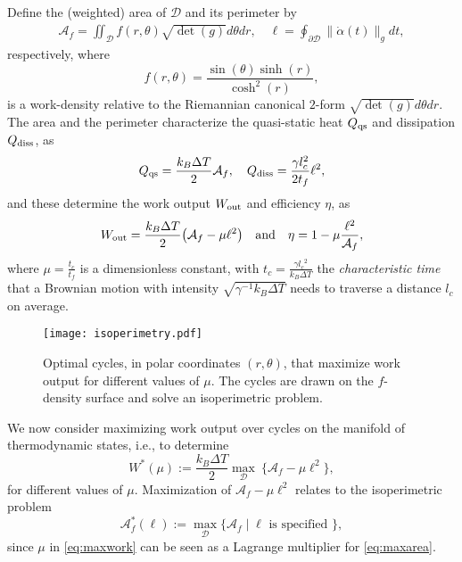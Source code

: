 \documentclass[
 reprint,
superscriptaddress,
 amsmath,amssymb,prl
 aps
]{revtex4-2}
\newcommand{\Area}{{\mathcal A}}
\newcommand{\lam}{{l_c}}
\begin{document}
Define the (weighted) area of $\mathcal D$  and its perimeter by
\begin{align*}
    \Area_f =\iint_{\mathcal D}f(r,\theta)\sqrt{\det(g)}d\theta d r,\quad 
    \ell = \oint_{\partial \mathcal D} \|\dot\alpha(t)\|_gdt,
\end{align*}
respectively, where 
\[
f(r,\theta)=\frac{\sin(\theta)\sinh(r)}{\cosh^2(r)},
\]
is a work-density relative to the Riemannian canonical $2$-form $\sqrt{\det(g)}d\theta dr$. 
 The area and the perimeter characterize the quasi-static heat 
 $Q_{\rm qs}$ and dissipation $Q_{\rm diss}$, as
  \begin{align*}
    Q_{\rm qs} = \frac{k_B\Delta T}{2} \Area_f,\quad Q_{\rm diss} = \frac{\gamma l_c^2}{2t_f} \ell^2,
\end{align*}
 and these determine the work output $W_{\rm out}$ and efficiency $\eta$, as
\begin{equation}
     W_{\rm out}=\frac{k_B\Delta T}{2}\big(\Area_f-\mu \ell^2\big)\quad\mbox{and}\quad \eta = 1-\mu\frac{\ell^2}{\Area_f},
     \label{eq:defefficiency}
\end{equation}
where
 $\mu=\frac{t_c}{t_f}$ is a dimensionless constant, with  $t_c = \frac{\gamma \lam^2}{k_B \Delta T}$ the {\em characteristic time} that a Brownian motion with intensity $\sqrt{\gamma^{-1}k_B\Delta T}$ needs to traverse a distance $\lam$ on average. 
 \begin{figure}[t]
     \centering
     \texttt{[image: isoperimetry.pdf]}
     \caption{Optimal cycles, in polar coordinates $(r,\theta)$, that maximize work output for different values of $\mu$. The cycles are drawn on the $f$-density  surface and solve an isoperimetric problem. }
     \label{fig:max-work-amir}
 \end{figure}

We now consider maximizing work output over cycles on the manifold of thermodynamic states, i.e., to determine 
\begin{equation}\label{eq:maxwork}
    W^*(\mu):=\frac{k_B\Delta T}{2}\max_{\mathcal D} ~\{\Area_f - \mu \ell^2\},
\end{equation}
for different values of $\mu$. Maximization of $\Area_f-\mu\ell^2$ relates to the isoperimetric problem
\begin{equation}\label{eq:maxarea}
    \Area_f^*(\ell) :=\max_{\mathcal D}\{\Area_f \mid   \ell \mbox{ is specified }\},
\end{equation}
since
$\mu$ in \eqref{eq:maxwork} can be seen as a Lagrange multiplier for \eqref{eq:maxarea}.
\end{document}
